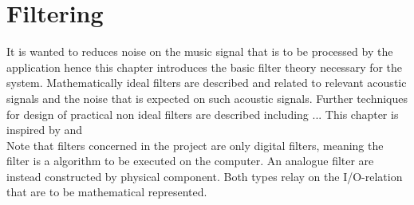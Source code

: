 \chapter{Filtering} \label{ch7}
It is wanted to reduces noise on the music signal that is to be processed by the application hence this chapter introduces the basic filter theory necessary for the system. Mathematically ideal filters are described and related to relevant acoustic signals and the noise that is expected on such acoustic signals. Further techniques for design of practical non ideal filters are described including ... This chapter is inspired by \cite{DTSP, ch. 5,7} and \cite{FSP, sec. 3.4.4}\\
Note that filters concerned in the project are only digital filters, meaning the filter is a algorithm to be executed on the computer. An analogue filter are instead constructed by physical component. Both types relay on the I/O-relation that are to be mathematical represented.     


